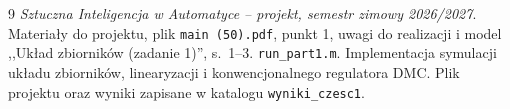 \begin{thebibliography}{9}
\textit{Sztuczna Inteligencja w Automatyce -- projekt, semestr zimowy 2026/2027}. Materiały do projektu, plik \texttt{main (50).pdf}, punkt 1, uwagi do realizacji i model ,,Układ zbiorników (zadanie 1)'', s.~1--3.
\texttt{run\_part1.m}. Implementacja symulacji układu zbiorników, linearyzacji i konwencjonalnego regulatora DMC. Plik projektu oraz wyniki zapisane w katalogu \texttt{wyniki\_czesc1}.
\end{thebibliography}
